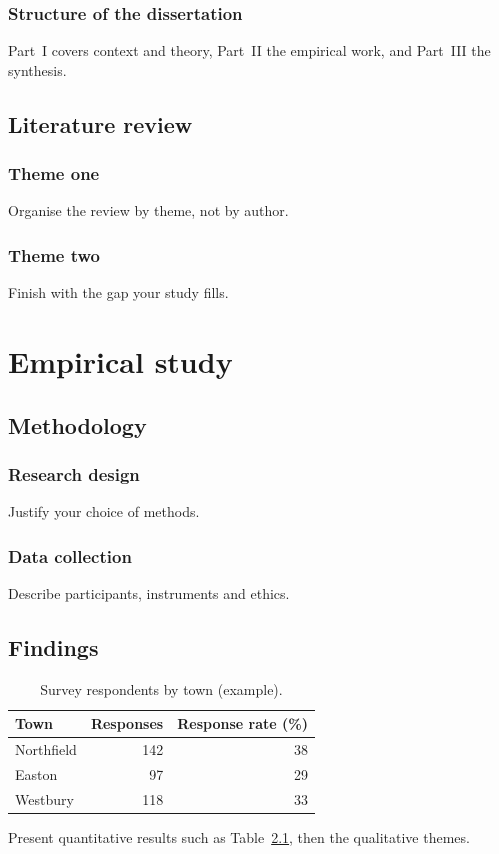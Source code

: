 \documentclass[11pt,a4paper,twoside,openright]{book}
\begin{document}
\section{Structure of the dissertation}
Part~I covers context and theory, Part~II the empirical work, and Part~III the synthesis.

\chapter{Literature review}
\section{Theme one}
Organise the review by theme, not by author.
\section{Theme two}
Finish with the gap your study fills.

\part{Empirical study}

\chapter{Methodology}
\section{Research design}
Justify your choice of methods.
\section{Data collection}
Describe participants, instruments and ethics.

\chapter{Findings}
\begin{table}[ht]
\centering
\caption{Survey respondents by town (example).}
\label{tab:respondents}
\begin{tabular}{lrr}
\toprule
Town & Responses & Response rate (\%) \\
\midrule
Northfield & 142 & 38 \\
Easton & 97 & 29 \\
Westbury & 118 & 33 \\
\bottomrule
\end{tabular}
\end{table}
Present quantitative results such as Table~\ref{tab:respondents}, then the qualitative themes.
\end{document}
